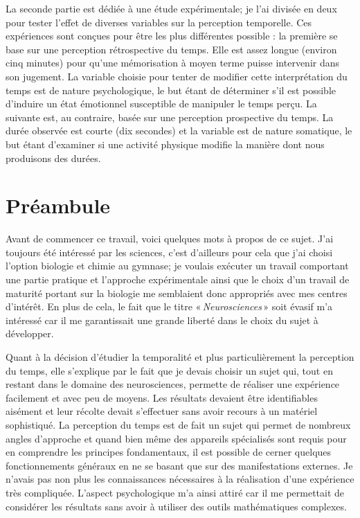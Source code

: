 \documentclass[12pt,fleqn,oneside,french,openany]{book} %
\begin{document}
La seconde partie est dédiée à une étude expérimentale; je l'ai divisée en deux pour tester l'effet de diverses variables sur la perception temporelle. Ces expériences sont conçues pour être les plus différentes possible : la première se base sur une perception rétrospective du temps. Elle est assez longue (environ cinq minutes) pour qu'une mémorisation à moyen terme puisse intervenir dans son jugement. La variable choisie pour tenter de modifier cette interprétation du temps est de nature psychologique, le but étant de déterminer s'il est possible d'induire un état émotionnel susceptible de manipuler le temps perçu. La suivante est, au contraire, basée sur une perception prospective du temps. La durée observée est courte (dix secondes) et la variable est de nature somatique, le but étant d'examiner si une activité physique modifie la manière dont nous produisons des durées.

\section{Préambule}
Avant de commencer ce travail, voici quelques mots à propos de ce sujet. J'ai toujours été intéressé par les sciences, c'est d'ailleurs pour cela que j'ai choisi l'option biologie et chimie au gymnase; je voulais exécuter un travail comportant une partie pratique et l'approche expérimentale ainsi que le choix d'un travail de maturité portant sur la biologie me semblaient donc appropriés avec mes centres d'intérêt. En plus de cela, le fait que le titre «\,\emph{Neurosciences}\,» soit évasif m'a intéressé car il me garantissait une grande liberté dans le choix du sujet à développer.

Quant à la décision d'étudier la temporalité et plus particulièrement la perception du temps, elle s'explique par le fait que je devais choisir un sujet qui, tout en restant dans le domaine des neurosciences, permette de réaliser une expérience facilement et avec peu de moyens. Les résultats devaient être identifiables aisément et leur récolte devait s'effectuer sans avoir recours à un matériel sophistiqué. La perception du temps est de fait un sujet qui permet de nombreux angles d'approche et quand bien même des appareils spécialisés sont requis pour en comprendre les principes fondamentaux, il est possible de cerner quelques fonctionnements généraux en ne se basant que sur des manifestations externes. Je n'avais pas non plus les connaissances nécessaires à la réalisation d'une expérience très compliquée. L'aspect psychologique m'a ainsi attiré car il me permettait de considérer les résultats sans avoir à utiliser des outils mathématiques complexes.
\end{document}
